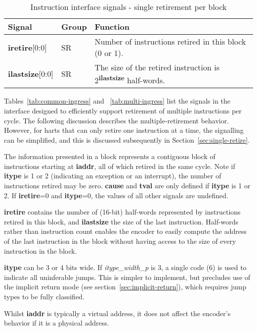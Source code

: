 \begin{table}[htp]
    \centering
    \caption{Instruction interface signals - single retirement per block}
    \label{tab:single-ingress}
    \begin{tabulary}{\textwidth}{|l|l|p{110mm}|}
        \hline
        \textbf{Signal} & \textbf{Group} & \textbf{Function} \\
        \hline
        \textbf{iretire}[0:0] & SR & Number of instructions retired in this block (0 or 1).\\
        \hline
        \textbf{ilastsize}[0:0] & SR & The size of the retired instruction is 2\textsuperscript{\textbf{ilastsize}} half-words.\\
        \hline
    \end{tabulary}
\end{table}

Tables~\ref{tab:common-ingress} and ~\ref{tab:multi-ingress}
list the signals in the interface designed to efficiently support retirement of multiple 
instructions per cycle.  The following discussion describes the multiple-retirement behavior.  
However, for harts that can only retire one instruction at a time, the signalling can be 
simplified, and this is discussed subsequently in Section~\ref{sec:single-retire}.  

The information presented in a block represents a contiguous
block of instructions starting at \textbf{iaddr}, all of which retired
in the same cycle. Note if \textbf{itype} is 1 or 2 (indicating an
exception or an interrupt), the number of instructions retired may be
zero. \textbf{cause} and \textbf{tval} are only defined if
\textbf{itype} is 1 or 2. If \textbf{iretire}=0 and \textbf{itype}=0,
the values of all other signals are undefined.

\textbf{iretire} contains the number of (16-bit) half-words represented by
instructions retired in this block, and \textbf{ilastsize} the size of the last
instruction.  Half-words rather than instruction count enables the encoder to easily compute the address of
the last instruction in the block without having access to the size of every 
instruction in the block.  

\textbf{itype} can be 3 or 4 bits wide.  If \textit{itype\_width\_p} is 3, a single code (6) is used to 
indicate all uninferable jumps.  This is simpler to implement, but precludes use of the implicit return mode
(see section~\ref{sec:implicit-return}), which requires jump types to be fully classified.

Whilst \textbf{iaddr} is typically a virtual address, it does not affect the encoder's behavior
if it is a physical address.

